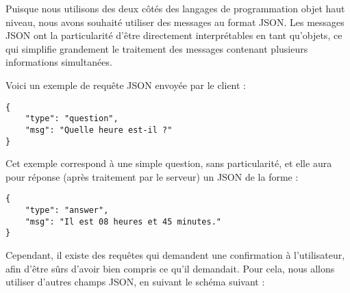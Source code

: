 \documentclass[a4paper,10pt]{report}
\begin{document}
          {Puisque nous utilisons des deux côtés des langages de programmation objet haut niveau, nous avons souhaité utiliser des messages au format JSON. Les messages JSON ont la particularité d'être directement interprétables en tant qu'objets, ce qui simplifie grandement le traitement des messages contenant plusieurs informations
          simultanées.\newline}


          {Voici un exemple de requête JSON envoyée par le client :}
          \begin{listing}[h]
            \begin{verbatim}
{
    "type": "question",
    "msg": "Quelle heure est-il ?"
}
            \end{verbatim}
          \end{listing}

          {Cet exemple correspond à une simple question, sans particularité, et elle aura pour réponse (après traitement par le serveur) un JSON de la forme :}

          \begin{listing}[h]
            \begin{verbatim}
{
    "type": "answer",
    "msg": "Il est 08 heures et 45 minutes."
}
            \end{verbatim}
          \end{listing}

          {Cependant, il existe des requêtes qui demandent une confirmation à l'utilisateur, afin d'être sûrs d'avoir bien compris ce qu'il demandait. Pour cela, nous allons utiliser d'autres champs JSON, en suivant le schéma suivant :}
\end{document}
